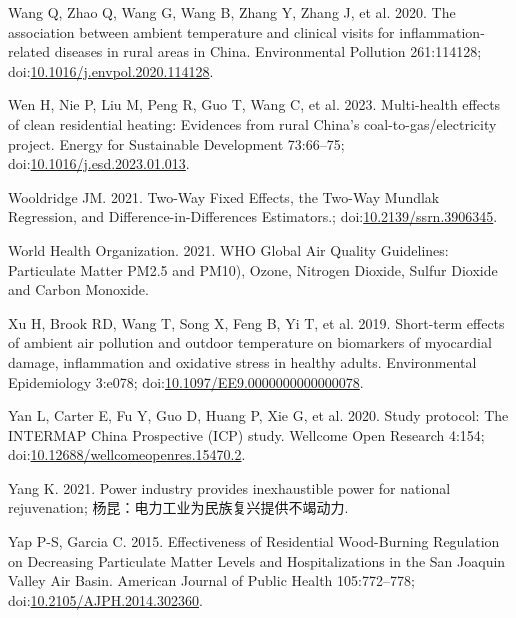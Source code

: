 \documentclass[
  letterpaper,
  DIV=11,
  numbers=noendperiod]{scrartcl}
\newlength{\cslhangindent}
\newenvironment{CSLReferences}[2] %
 {\begin{list}{}{%
  \setlength{\itemindent}{0pt}
  \setlength{\leftmargin}{0pt}
  \setlength{\parsep}{0pt}
  \ifodd #1
   \setlength{\leftmargin}{\cslhangindent}
   \setlength{\itemindent}{-1\cslhangindent}
  \fi
  \setlength{\itemsep}{#2\baselineskip}}}
 {\end{list}}
\begin{document}
\begin{CSLReferences}{1}{1}
Wang Q, Zhao Q, Wang G, Wang B, Zhang Y, Zhang J, et al. 2020. The
association between ambient temperature and clinical visits for
inflammation-related diseases in rural areas in {China}. Environmental
Pollution 261:114128;
doi:\href{https://doi.org/10.1016/j.envpol.2020.114128}{10.1016/j.envpol.2020.114128}.

Wen H, Nie P, Liu M, Peng R, Guo T, Wang C, et al. 2023. Multi-health
effects of clean residential heating: {Evidences} from rural {China}'s
coal-to-gas/electricity project. Energy for Sustainable Development
73:66--75;
doi:\href{https://doi.org/10.1016/j.esd.2023.01.013}{10.1016/j.esd.2023.01.013}.

Wooldridge JM. 2021. Two-{Way Fixed Effects}, the {Two-Way Mundlak
Regression}, and {Difference-in-Differences Estimators}.;
doi:\href{https://doi.org/10.2139/ssrn.3906345}{10.2139/ssrn.3906345}.

World Health Organization. 2021. {WHO Global Air Quality Guidelines}:
{Particulate Matter PM2}.5 and {PM10}), {Ozone}, {Nitrogen Dioxide},
{Sulfur Dioxide} and {Carbon Monoxide}.

Xu H, Brook RD, Wang T, Song X, Feng B, Yi T, et al. 2019. Short-term
effects of ambient air pollution and outdoor temperature on biomarkers
of myocardial damage, inflammation and oxidative stress in healthy
adults. Environmental Epidemiology 3:e078;
doi:\href{https://doi.org/10.1097/EE9.0000000000000078}{10.1097/EE9.0000000000000078}.

Yan L, Carter E, Fu Y, Guo D, Huang P, Xie G, et al. 2020. Study
protocol: {The INTERMAP China Prospective} ({ICP}) study. Wellcome Open
Research 4:154;
doi:\href{https://doi.org/10.12688/wellcomeopenres.15470.2}{10.12688/wellcomeopenres.15470.2}.

Yang K. 2021. Power industry provides inexhaustible power for national
rejuvenation; 杨昆：电力工业为民族复兴提供不竭动力.

Yap P-S, Garcia C. 2015. Effectiveness of {Residential Wood-Burning
Regulation} on {Decreasing Particulate Matter Levels} and
{Hospitalizations} in the {San Joaquin Valley Air Basin}. American
Journal of Public Health 105:772--778;
doi:\href{https://doi.org/10.2105/AJPH.2014.302360}{10.2105/AJPH.2014.302360}.


\end{CSLReferences}
\end{document}
